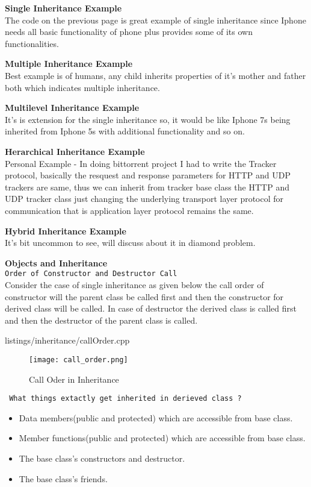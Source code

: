 \documentclass[oops.tex]{subfiles}
\begin{document}
{\bf Single Inheritance Example}\\
The code on the previous page is great example of single inheritance since
Iphone needs all basic functionality of phone plus provides some of its own
functionalities.

{\bf Multiple Inheritance Example}\\
Best example is of humans, any child inherits properties of it's mother and
father both which indicates multiple inheritance.

{\bf Multilevel Inheritance Example}\\
It's is extension for the single inheritance so, it would be like Iphone 7s
being inherited from Iphone 5s with additional functionality and so on.

{\bf Herarchical Inheritance Example}\\
Personal Example - In doing bittorrent project I had to write the Tracker
protocol, basically the resquest and response parameters for HTTP and UDP 
trackers are same, thus we can inherit from tracker base class the HTTP and UDP
tracker class just changing the underlying transport layer protocol for
communication that is application layer protocol remains the same.

{\bf Hybrid Inheritance Example}\\
It's bit uncommon to see, will discuss about it in diamond problem.


{\bf Objects and Inheritance}\\

\texttt{Order of Constructor and Destructor Call}\\
Consider the case of single inheritance as given below the call order of
constructor will the parent class be called first and then the constructor for 
derived class will be called. In case of destructor the derived class is called
first and then the destructor of the parent class is called.


{listings/inheritance/callOrder.cpp}

\begin{figure}[h]
    \begin{center}
        \caption{Call Oder in Inheritance}
        \texttt{[image: call\_order.png]}
    \end{center}
\end{figure}

\texttt{ What things extactly get inherited in derieved class ?}
\begin{itemize}
    \item Data members(public and protected) which are accessible from base class.
    \item Member functions(public and protected) which are accessible from base class.
    \item The base class’s constructors and destructor.
    \item The base class’s friends.\\
\end{itemize}
\end{document}
